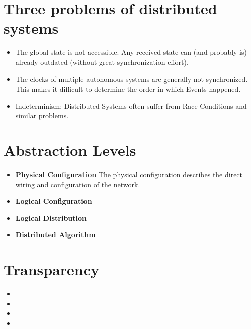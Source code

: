 \documentclass{tudexercise}
\begin{document}
	\section{Three problems of distributed systems}
		\begin{itemize}
			\item	The global state is not accessible. Any received state can (and probably is) already outdated (without great synchronization effort).
			\item	The clocks of multiple autonomous systems are generally not synchronized. This makes it difficult to determine the order in which Events happened.
			\item	Indeterminism: Distributed Systems often suffer from Race Conditions and similar problems.
		\end{itemize}
		
	\section{Abstraction Levels}
		\begin{itemize}
			\item \textbf{Physical Configuration}		The physical configuration describes the direct wiring and configuration of the network.
			\item \textbf{Logical Configuration} 
			\item \textbf{Logical Distribution}			
			\item \textbf{Distributed Algorithm}			
		\end{itemize}
	\section{Transparency}
		
		\begin{itemize}
			\item	
			\item	
			\item	
			\item	
		\end{itemize}
\end{document}
